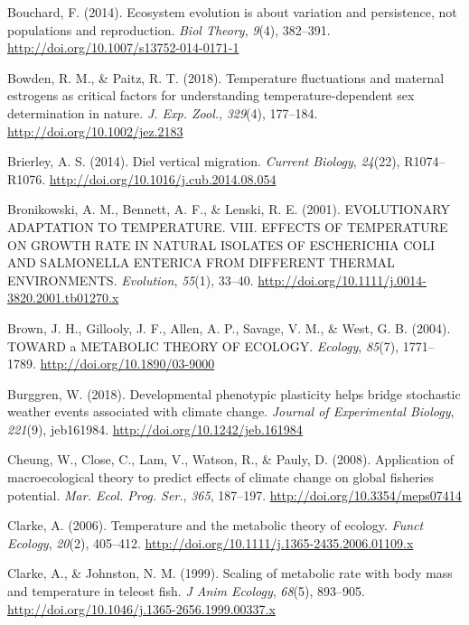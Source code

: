 \documentclass[12pt,twoside]{reedthesis}
\begin{document}
\leavevmode\hypertarget{ref-bouchard_ecosystem_2014}{}%
Bouchard, F. (2014). Ecosystem evolution is about variation and persistence, not populations and reproduction. \emph{Biol Theory}, \emph{9}(4), 382--391. \url{http://doi.org/10.1007/s13752-014-0171-1}

\leavevmode\hypertarget{ref-bowden_temperature_2018}{}%
Bowden, R. M., \& Paitz, R. T. (2018). Temperature fluctuations and maternal estrogens as critical factors for understanding temperature-dependent sex determination in nature. \emph{J. Exp. Zool.}, \emph{329}(4), 177--184. \url{http://doi.org/10.1002/jez.2183}

\leavevmode\hypertarget{ref-brierley_diel_2014}{}%
Brierley, A. S. (2014). Diel vertical migration. \emph{Current Biology}, \emph{24}(22), R1074--R1076. \url{http://doi.org/10.1016/j.cub.2014.08.054}

\leavevmode\hypertarget{ref-bronikowski_evolutionary_2001}{}%
Bronikowski, A. M., Bennett, A. F., \& Lenski, R. E. (2001). EVOLUTIONARY ADAPTATION TO TEMPERATURE. VIII. EFFECTS OF TEMPERATURE ON GROWTH RATE IN NATURAL ISOLATES OF ESCHERICHIA COLI AND SALMONELLA ENTERICA FROM DIFFERENT THERMAL ENVIRONMENTS. \emph{Evolution}, \emph{55}(1), 33--40. \url{http://doi.org/10.1111/j.0014-3820.2001.tb01270.x}

\leavevmode\hypertarget{ref-brown_toward_2004}{}%
Brown, J. H., Gillooly, J. F., Allen, A. P., Savage, V. M., \& West, G. B. (2004). TOWARD a METABOLIC THEORY OF ECOLOGY. \emph{Ecology}, \emph{85}(7), 1771--1789. \url{http://doi.org/10.1890/03-9000}

\leavevmode\hypertarget{ref-burggren_developmental_2018}{}%
Burggren, W. (2018). Developmental phenotypic plasticity helps bridge stochastic weather events associated with climate change. \emph{Journal of Experimental Biology}, \emph{221}(9), jeb161984. \url{http://doi.org/10.1242/jeb.161984}

\leavevmode\hypertarget{ref-cheung_application_2008}{}%
Cheung, W., Close, C., Lam, V., Watson, R., \& Pauly, D. (2008). Application of macroecological theory to predict effects of climate change on global fisheries potential. \emph{Mar. Ecol. Prog. Ser.}, \emph{365}, 187--197. \url{http://doi.org/10.3354/meps07414}

\leavevmode\hypertarget{ref-clarke_temperature_2006}{}%
Clarke, A. (2006). Temperature and the metabolic theory of ecology. \emph{Funct Ecology}, \emph{20}(2), 405--412. \url{http://doi.org/10.1111/j.1365-2435.2006.01109.x}

\leavevmode\hypertarget{ref-clarke_scaling_1999}{}%
Clarke, A., \& Johnston, N. M. (1999). Scaling of metabolic rate with body mass and temperature in teleost fish. \emph{J Anim Ecology}, \emph{68}(5), 893--905. \url{http://doi.org/10.1046/j.1365-2656.1999.00337.x}
\end{document}
